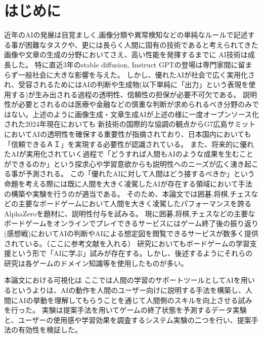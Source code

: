 \chapter{はじめに}
近年のAIの発展は目覚ましく,画像分類や異常検知などの単純なルールで記述する事が困難なタスクや、更には長らく人間に固有の技術であると考えられてきた画像や文章の生成の分野においてさえ、高い性能を発揮するまでに
AI技術は成長した。
特に直近3年のstable diffusion\cite{diffusion}, Instruct GPT\cite{GPT}の登場は専門家間に留まらず一般社会に大きな影響を与えた。
しかし、優れたAIが社会で広く実用化され、受容されるためにはAIの判断や生成物(以下単純に「出力」という表現を使用する)が生み出される過程の透明性、信頼性の担保が必要不可欠である。
説明性が必要とされるのは医療や金融などの慎重な判断が求められるべき分野のみではない。上述のように画像生成・文章生成AIが上述の様に一度オープンソース化された2024年現在においても
新技術の国際的な協調の観点からG7広島サミットにおいてAIの透明性を確保する重要性が指摘されており\cite{Hiroshima}、日本国内においても「信頼できるＡＩ」を実現する必要性が認識されている\cite{グランドデザイン}。
また、将来的に優れたAIが実用化されていく過程で「どうすれば人間もAIのような成果を生むことができるのか」という探求心や学習意欲からも説明性へのニーズが広く湧き起こる事が予測される。
この「優れたAIに対して人間はどう接するべきか」という命題を考える際には既に人間を大きく凌駕したAIが存在する領域において手法の構築や実験を行うのが適当である。
そのため、本論文では囲碁,将棋,チェスなどの主要なボードゲームにおいて人間を大きく凌駕したパフォーマンスを誇るAlphaZero\cite{AlphaZero}を題材に、説明性付与を試みる。
現に囲碁,将棋,チェスなどの主要なボードゲームをオンラインでプレイできるサービスにはゲーム終了後の振り返り(感想戦)においてAIの判断やAIによる想定図を閲覧できるサービスが数多く提供されている。（ここに参考文献を入れる）
研究においてもボードゲームの学習支援という形で「AIに学ぶ」試みが存在する。しかし、後述するようにそれらの研究は各ゲームのドメイン知識等を使用したものが多い。

本論文における可視化は
ここでは人間の学習のサポートツールとしてAIを用いるというよりは、AIの動作を人間のユーザー向けに説明する手法を構築し、人間にAIの挙動を理解してもらうことを通じて人間側のスキルを向上させる試みを行った。
実験は提案手法を用いてゲームの終了状態を予測するデータ実験と、ユーザーの使用感や学習効果を調査するシステム実験の二つを行い、提案手法の有効性を検証した。
